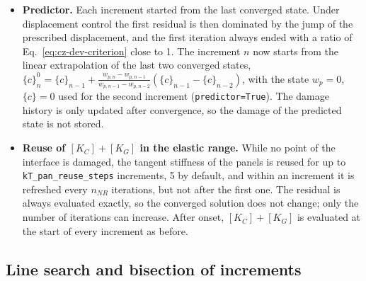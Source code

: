 \begin{itemize}
	\item \textbf{Predictor.} Each increment started from the last converged state. Under displacement control the first residual is then dominated by the jump of the prescribed displacement, and the first iteration always ended with a ratio of Eq.~\ref{eq:cz-dev-criterion} close to 1. The increment $n$ now starts from the linear extrapolation of the last two converged states, $\{c\}_{n}^{0} = \{c\}_{n-1} + \frac{w_{p,n} - w_{p,n-1}}{w_{p,n-1} - w_{p,n-2}} \left( \{c\}_{n-1} - \{c\}_{n-2} \right)$, with the state $w_p = 0$, $\{c\} = 0$ used for the second increment (\texttt{predictor=True}). The damage history is only updated after convergence, so the damage of the predicted state is not stored.
	\item \textbf{Reuse of $[K_C] + [K_G]$ in the elastic range.} While no point of the interface is damaged, the tangent stiffness of the panels is reused for up to \texttt{kT\_pan\_reuse\_steps} increments, 5 by default, and within an increment it is refreshed every $n_{NR}$ iterations, but not after the first one. The residual is always evaluated exactly, so the converged solution does not change; only the number of iterations can increase. After onset, $[K_C] + [K_G]$ is evaluated at the start of every increment as before.
\end{itemize}

\subsection{Line search and bisection of increments}\label{sec:cz-dev-robust}


